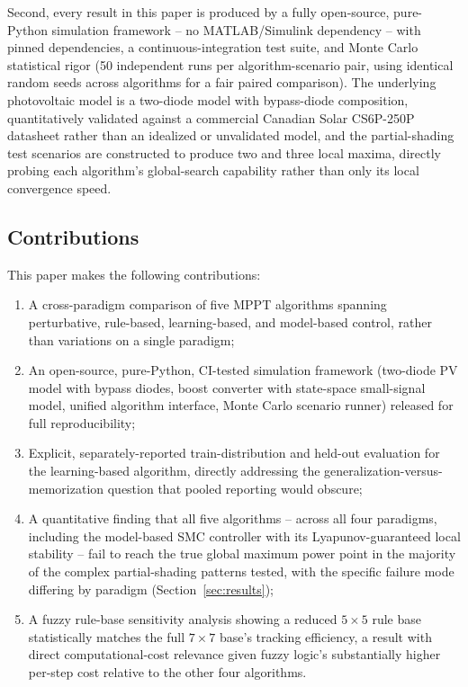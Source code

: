 Second, every result in this paper is produced by a fully open-source,
pure-Python simulation framework -- no MATLAB/Simulink dependency -- with
pinned dependencies, a continuous-integration test suite, and Monte Carlo
statistical rigor (50 independent runs per algorithm-scenario pair, using
identical random seeds across algorithms for a fair paired comparison). The
underlying photovoltaic model is a two-diode model with bypass-diode
composition, quantitatively validated against a commercial Canadian Solar
CS6P-250P datasheet rather than an idealized or unvalidated model, and the
partial-shading test scenarios are constructed to produce two and three
local maxima, directly probing each algorithm's global-search capability
rather than only its local convergence speed.

\subsection{Contributions}
This paper makes the following contributions:
\begin{enumerate}
  \item A cross-paradigm comparison of five MPPT algorithms spanning
    perturbative, rule-based, learning-based, and model-based control,
    rather than variations on a single paradigm;
  \item An open-source, pure-Python, CI-tested simulation framework
    (two-diode PV model with bypass diodes, boost converter with
    state-space small-signal model, unified algorithm interface, Monte
    Carlo scenario runner) released for full reproducibility;
  \item Explicit, separately-reported train-distribution and held-out
    evaluation for the learning-based algorithm, directly addressing the
    generalization-versus-memorization question that pooled reporting
    would obscure;
  \item A quantitative finding that all five algorithms -- across all four
    paradigms, including the model-based SMC controller with its
    Lyapunov-guaranteed local stability -- fail to reach the true global
    maximum power point in the majority of the complex partial-shading
    patterns tested, with the specific failure mode differing by paradigm
    (Section~\ref{sec:results});
  \item A fuzzy rule-base sensitivity analysis showing a reduced
    $5\times5$ rule base statistically matches the full $7\times7$ base's
    tracking efficiency, a result with direct computational-cost relevance
    given fuzzy logic's substantially higher per-step cost relative to the
    other four algorithms.
\end{enumerate}

